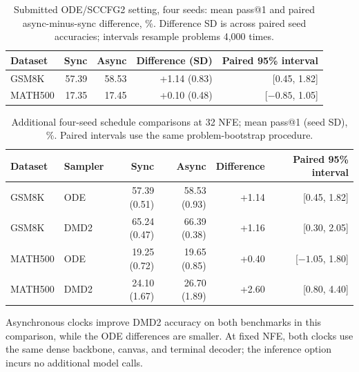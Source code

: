 \documentclass{article}
\newenvironment{revision}{\begingroup\color{blue}}{\endgroup}
\begin{document}
\begin{revision}
\begin{table}[htbp]\color{blue}\centering\small
\caption{Submitted ODE/SCCFG2 setting, four seeds: mean pass@1 and paired async-minus-sync difference, \%. Difference SD is across paired seed accuracies; intervals resample problems 4,000 times.}
\label{tab:submittedschedule4}
\begin{tabular}{@{}lrrrr@{}}\toprule
Dataset & Sync & Async & Difference (SD) & Paired 95\% interval\\\midrule
GSM8K & 57.39 & 58.53 & +1.14 (0.83) & [0.45, 1.82]\\
MATH500 & 17.35 & 17.45 & +0.10 (0.48) & [$-0.85$, 1.05]\\\bottomrule
\end{tabular}
\end{table}
\begin{table}[htbp]\color{blue}\centering\small
\caption{Additional four-seed schedule comparisons at 32 NFE; mean pass@1 (seed SD), \%. Paired intervals use the same problem-bootstrap procedure.}
\label{tab:additionalschedule4}
\begin{tabular}{@{}llrrrr@{}}\toprule
Dataset & Sampler & Sync & Async & Difference & Paired 95\% interval\\\midrule
GSM8K & ODE & 57.39 (0.51) & 58.53 (0.93) & +1.14 & [0.45, 1.82]\\
GSM8K & DMD2 & 65.24 (0.47) & 66.39 (0.38) & +1.16 & [0.30, 2.05]\\
MATH500 & ODE & 19.25 (0.72) & 19.65 (0.85) & +0.40 & [$-1.05$, 1.80]\\
MATH500 & DMD2 & 24.10 (1.67) & 26.70 (1.89) & +2.60 & [0.80, 4.40]\\\bottomrule
\end{tabular}
\end{table}
Asynchronous clocks improve DMD2 accuracy on both benchmarks in this comparison, while the ODE differences are smaller. At fixed NFE, both clocks use the same dense backbone, canvas, and terminal decoder; the inference option incurs no additional model calls.
\end{revision}
\end{document}
